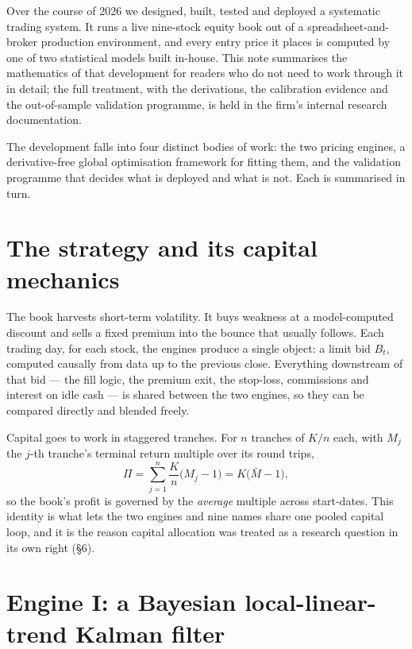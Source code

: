 \documentclass[11pt,a4paper]{article}
\begin{document}
Over the course of 2026 we designed, built, tested and deployed a systematic
trading system. It runs a live nine-stock equity book out of a
spreadsheet-and-broker production environment, and every entry price it
places is computed by one of two statistical models built in-house. This note
summarises the mathematics of that development for readers who do not need to
work through it in detail; the full treatment, with the derivations, the
calibration evidence and the out-of-sample validation programme, is held in
the firm's internal research documentation.

The development falls into four distinct bodies of work: the two pricing
engines, a derivative-free global optimisation framework for fitting them,
and the validation programme that decides what is deployed and what is not.
Each is summarised in turn.

\section{The strategy and its capital mechanics}

The book harvests short-term volatility. It buys weakness at a
model-computed discount and sells a fixed premium into the bounce that
usually follows. Each trading day, for each stock, the engines produce a
single object: a limit bid $B_t$, computed causally from data up to the
previous close. Everything downstream of that bid --- the fill logic, the
premium exit, the stop-loss, commissions and interest on idle cash --- is
shared between the two engines, so they can be compared directly and blended
freely.

Capital goes to work in staggered tranches. For $n$ tranches of $K/n$ each,
with $M_j$ the $j$-th tranche's terminal return multiple over its round
trips,
\begin{equation}
\Pi=\sum_{j=1}^{n}\frac{K}{n}\bigl(M_j-1\bigr)=K\bigl(\bar M-1\bigr),
\end{equation}
so the book's profit is governed by the \emph{average} multiple across
start-dates. This identity is what lets the two engines and nine names share
one pooled capital loop, and it is the reason capital allocation was treated
as a research question in its own right (\S6).

\section{Engine I: a Bayesian local-linear-trend Kalman filter}
\end{document}
